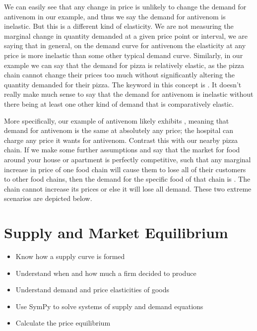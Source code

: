 \documentclass[letterpaper,10pt,english]{jupyterBook}
\begin{document}
\sphinxAtStartPar
We can easily see that any change in price is unlikely to change the demand for antivenom in our example, and thus we say the demand for antivenom is inelastic. But this is a different kind of elasticity. We are not measuring the marginal change in quantity demanded at a given price point or interval, we are saying that in general, on the demand curve for antivenom the elasticity at any price is more inelastic than some other typical demand curve. Similarly, in our example we can say that the demand for pizza is relatively elastic, as the pizza chain cannot change their prices too much without significantly altering the quantity demanded for their pizza. The keyword in this concept is . It doesn’t really make much sense to say that the demand for antivenom is inelastic without there being at least one other kind of demand that is comparatively elastic.

\sphinxAtStartPar
More specifically, our example of antivenom likely exhibits , meaning that demand for antivenom is the same at absolutely any price; the hospital can charge any price it wants for antivenom. Contrast this with our nearby pizza chain. If we make some further assumptions and say that the market for food around your house or apartment is perfectly competitive, such that any marginal increase in price of one food chain will cause them to lose all of their customers to other food chains, then the demand for the specific food of that chain is . The chain cannot increase its prices or else it will lose all demand. These two extreme scenarios are depicted below.

\noindent{}

\noindent{}


\section{Supply and Market Equilibrium}
\label{\detokenize{content/02-supply/index:supply-and-market-equilibrium}}\label{\detokenize{content/02-supply/index::doc}}
\sphinxAtStartPar
{}
\begin{itemize}
\item {} 
\sphinxAtStartPar
Know how a supply curve is formed

\item {} 
\sphinxAtStartPar
Understand when and how much a firm decided to produce

\item {} 
\sphinxAtStartPar
Understand demand and price elasticities of goods

\item {} 
\sphinxAtStartPar
Use SymPy to solve systems of supply and demand equations

\item {} 
\sphinxAtStartPar
Calculate the price equilibrium

\end{itemize}
\end{document}
